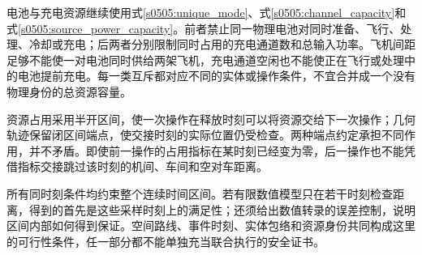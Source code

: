 电池与充电资源继续使用式\eqref{s0505:unique_mode}、式\eqref{s0505:channel_capacity}和式\eqref{s0505:source_power_capacity}。前者禁止同一物理电池对同时准备、飞行、处理、冷却或充电；后两者分别限制同时占用的充电通道数和总输入功率。飞机间距足够不能使一对电池同时供给两架飞机，充电通道空闲也不能使正在飞行或处理中的电池提前充电。每一类互斥都对应不同的实体或操作条件，不宜合并成一个没有物理身份的总资源容量。

资源占用采用半开区间，使一次操作在释放时刻可以将资源交给下一次操作；几何轨迹保留闭区间端点，使交接时刻的实际位置仍受检查。两种端点约定承担不同作用，并不矛盾。即使前一操作的占用指标在某时刻已经变为零，后一操作也不能凭借指标交接跳过该时刻的机间、车间和空对车距离。

所有同时刻条件均约束整个连续时间区间。若有限数值模型只在若干时刻检查距离，得到的首先是这些采样时刻上的满足性；还须给出数值转录的误差控制，说明区间内部如何得到保证。空间路线、事件时刻、实体包络和资源身份共同构成这里的可行性条件，任一部分都不能单独充当联合执行的安全证书。
